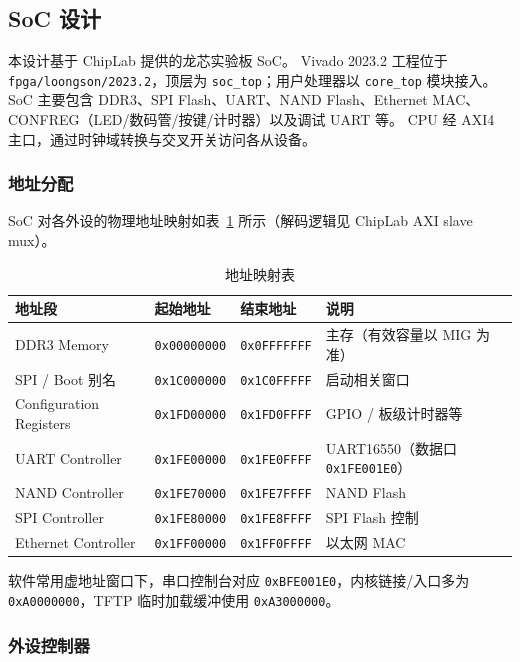 \subsection{SoC 设计}

本设计基于 ChipLab 提供的龙芯实验板 SoC。
Vivado 2023.2 工程位于 \texttt{fpga/loongson/2023.2}，顶层为 \texttt{soc\_top}；用户处理器以 \texttt{core\_top} 模块接入。
SoC 主要包含 DDR3、SPI Flash、UART、NAND Flash、Ethernet MAC、CONFREG（LED/数码管/按键/计时器）以及调试 UART 等。
CPU 经 AXI4 主口，通过时钟域转换与交叉开关访问各从设备。


\subsubsection{地址分配}

SoC 对各外设的物理地址映射如表~\ref{tab:addr} 所示（解码逻辑见 ChipLab AXI slave mux）。

\begin{table}[H]
\centering
\caption{地址映射表}
\label{tab:addr}
\small
\begin{tabular}{llll}
\toprule
地址段 & 起始地址 & 结束地址 & 说明 \\
\midrule
DDR3 Memory & \texttt{0x00000000} & \texttt{0x0FFFFFFF} & 主存（有效容量以 MIG 为准） \\
SPI / Boot 别名 & \texttt{0x1C000000} & \texttt{0x1C0FFFFF} & 启动相关窗口 \\
Configuration Registers & \texttt{0x1FD00000} & \texttt{0x1FD0FFFF} & GPIO / 板级计时器等 \\
UART Controller & \texttt{0x1FE00000} & \texttt{0x1FE0FFFF} & UART16550（数据口 \texttt{0x1FE001E0}） \\
NAND Controller & \texttt{0x1FE70000} & \texttt{0x1FE7FFFF} & NAND Flash \\
SPI Controller & \texttt{0x1FE80000} & \texttt{0x1FE8FFFF} & SPI Flash 控制 \\
Ethernet Controller & \texttt{0x1FF00000} & \texttt{0x1FF0FFFF} & 以太网 MAC \\
\bottomrule
\end{tabular}
\end{table}

软件常用虚地址窗口下，串口控制台对应 \texttt{0xBFE001E0}，内核链接/入口多为 \texttt{0xA0000000}，TFTP 临时加载缓冲使用 \texttt{0xA3000000}。

\subsubsection{外设控制器}

